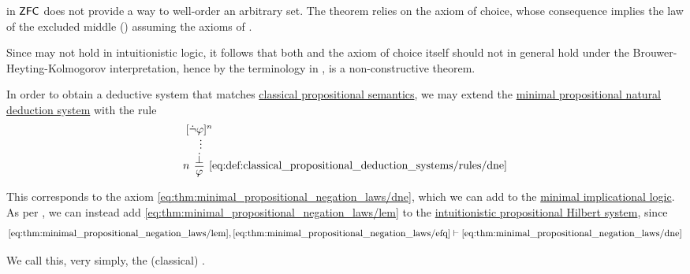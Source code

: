 \begin{example}\label{ex:con:brouwer_heyting_kolmogorov_interpretation/well_ordering_principle_zfc}
   in \hyperref[def:zfc]{\( \textsf{ZFC} \)} does not provide a way to well-order an arbitrary set. The theorem relies on the axiom of choice, whose consequence  implies the law of the excluded middle () assuming the axioms of .

  Since  may not hold in intuitionistic logic, it follows that both  and the axiom of choice itself should not in general hold under the Brouwer-Heyting-Kolmogorov interpretation, hence by the terminology in ,  is a non-constructive theorem.
\end{example}

\begin{definition}\label{def:classical_propositional_deduction_systems}
  In order to obtain a deductive system that matches \hyperref[def:propositional_entailment]{classical propositional semantics}, we may extend the \hyperref[def:minimal_propositional_natural_deduction_system]{minimal propositional natural deduction system} with the rule
  \begin{equation*}\taglabel[\logic{DNE}]{eq:def:classical_propositional_deduction_systems/rules/dne}
    \begin{prooftree}
      \hypo{ [\synneg \varphi]^n }
      \ellipsis {} { \synbot }
      \infer[left label=\( n \)]1[\ref{eq:def:classical_propositional_deduction_systems/rules/dne}]{ \varphi }
    \end{prooftree}
  \end{equation*}

  This corresponds to the axiom \eqref{eq:thm:minimal_propositional_negation_laws/dne}, which we can add to the \hyperref[def:minimal_implicational_logic]{minimal implicational logic}. As per , we can instead add \eqref{eq:thm:minimal_propositional_negation_laws/lem} to the \hyperref[def:intuitionistic_propositional_deduction_systems]{intuitionistic propositional Hilbert system}, since
  \begin{equation*}
    \eqref{eq:thm:minimal_propositional_negation_laws/lem}, \eqref{eq:thm:minimal_propositional_negation_laws/efq} \vdash \eqref{eq:thm:minimal_propositional_negation_laws/dne}
  \end{equation*}

  We call this, very simply, the (classical) .
\end{definition}

